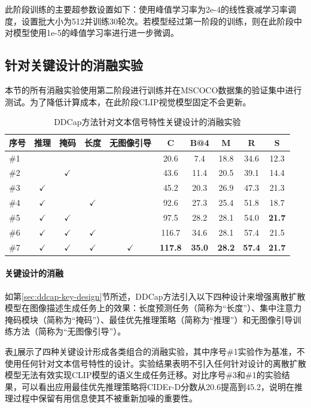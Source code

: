 此阶段训练的主要超参数设置如下：使用峰值学习率为2e-4的线性衰减学习率调度，设置批大小为512并训练30轮次。若模型经过第一阶段的训练，则在此阶段中对模型使用1e-5的峰值学习率进行进一步微调。%

\subsection{针对关键设计的消融实验}
本节的所有消融实验使用第二阶段进行训练并在MSCOCO数据集的验证集中进行测试。为了降低计算成本，在此阶段CLIP视觉模型固定不会更新。%

\begin{table}
  \centering
  \caption{DDCap方法针对文本信号特性关键设计的消融实验}
  \begin{tabular}{lccccccccc}
    \toprule   
    序号  & 推理 & 掩码 & 长度 & 无图像引导 & C & B@4 & M & R & S \\    
    \midrule
    \#1  &&&&& 20.6 & 7.4  & 18.8 & 34.6 &12.3  \\ 
    \#2  &&$\checkmark$&&& 43.6 & 11.4  & 20.5 & 39.1 & 14.4  \\ 
    \#3   &$\checkmark$ &&&& 45.2 & 20.3  & 26.9 & 47.3 & 21.3  \\
    \#4 &$\checkmark$&&$\checkmark$& & 92.6 & 27.3  & 25.4 & 51.8 & 18.7\\
    \#5  &$\checkmark$&$\checkmark$&&& 97.5 & 28.2  & 28.1 & 54.0 & \textbf{21.7} \\
    \#6  &$\checkmark$&$\checkmark$&$\checkmark$&& 116.7 & 34.6  & 28.1 & 57.4 & 21.5\\
    \#7 &$\checkmark$&$\checkmark$&$\checkmark$&$\checkmark$& \textbf{117.8} & \textbf{35.0}  & \textbf{28.2} & \textbf{57.4} & \textbf{21.7}\\
    \bottomrule
  \end{tabular}
  \label{tab:ddcap-component}
\end{table}

\paragraph{关键设计的消融} 
\label{sec:ddcap-exp-abl}
如第\ref{sec:ddcap-key-design}节所述，DDCap方法引入以下四种设计来增强离散扩散模型在图像描述生成任务上的效果：长度预测任务（简称为“长度”）、集中注意力掩码模块（简称为“掩码”）、最佳优先推理策略（简称为“推理”）和无图像引导训练方法（简称为“无图像引导”）。

表\ref{tab:ddcap-component}展示了四种关键设计形成各类组合的消融实验，其中序号\#1实验作为基准，不使用任何针对文本信号特性的设计。实验结果表明不引入任何针对设计的离散扩散模型无法有效实现CLIP模型的语义生成任务迁移。对比序号\#3和\#1的实验结果，可以看出应用最佳优先推理策略将CIDEr-D分数从20.6提高到45.2，说明在推理过程中保留有用信息使其不被重新加噪的重要性。

